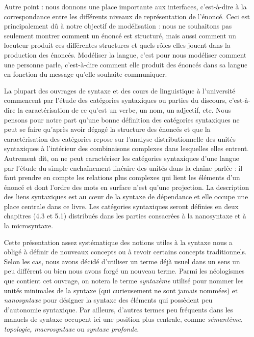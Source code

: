 Autre point : nous donnons une place importante aux interfaces, c’est-à-dire à la correspondance entre les différents niveaux de représentation de l’énoncé. Ceci est principalement dû à notre objectif de modélisation : nous ne souhaitons pas seulement montrer comment un énoncé est structuré, mais aussi comment un locuteur produit ces différentes structures et quels rôles elles jouent dans la production des énoncés. Modéliser la langue, c’est pour nous modéliser comment une personne parle, c’est-à-dire comment elle produit des énoncés dans sa langue en fonction du message qu’elle souhaite communiquer.

La plupart des ouvrages de syntaxe et des cours de linguistique à l’université commencent par l’étude des catégories syntaxiques ou parties du discours, c’est-à-dire la caractérisation de ce qu’est un verbe, un nom, un adjectif, etc. Nous pensons pour notre part qu’une bonne définition des catégories syntaxiques ne peut se faire qu’après avoir dégagé la structure des énoncés et que la caractérisation des catégories repose sur l’analyse distributionnelle des unités syntaxiques à l’intérieur des combinaisons complexes dans lesquelles elles entrent. Autrement dit, on ne peut caractériser les catégories syntaxiques d’une langue par l’étude du simple enchaînement linéaire des unités dans la chaîne parlée : il faut prendre en compte les relations plus complexes qui lient les éléments d’un énoncé et dont l’ordre des mots en surface n’est qu’une projection. La description des liens syntaxiques est au cœur de la syntaxe de dépendance et elle occupe une place centrale dans ce livre. Les catégories syntaxiques seront définies en deux chapitres (4.3 et 5.1) distribués dans les parties consacrées à la nanosyntaxe et à la microsyntaxe.

Cette présentation assez systématique des notions utiles à la syntaxe nous a obligé à définir de nouveaux concepts ou à revoir certains concepts traditionnels. Selon les cas, nous avons décidé d’utiliser un terme déjà usuel dans un sens un peu différent ou bien nous avons forgé un nouveau terme. Parmi les néologismes que contient cet ouvrage, on notera le terme \textit{syntaxème} utilisé pour nommer les unités minimales de la syntaxe (qui curieusement ne sont jamais nommées) et \textit{nanosyntaxe} pour désigner la syntaxe des éléments qui possèdent peu d’autonomie syntaxique. Par ailleurs, d’autres termes peu fréquents dans les manuels de syntaxe occupent ici une position plus centrale, comme \textit{sémantème}, \textit{topologie, macrosyntaxe} ou \textit{syntaxe profonde}.

